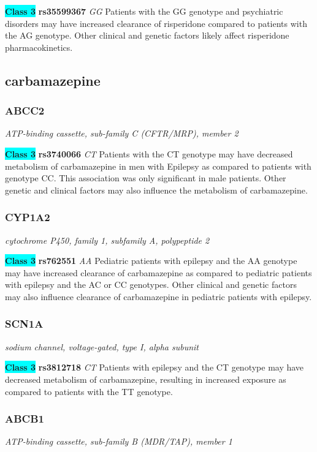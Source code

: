\documentclass{report}
\begin{document}
\textbf{\colorbox{cyan} {Class 3}} \textbf{ rs35599367 } \textit{ GG }
Patients with the GG genotype and psychiatric disorders may have increased clearance of risperidone compared to patients with the AG genotype. Other clinical and genetic factors likely affect risperidone pharmacokinetics.\newline\subsection{ carbamazepine }\subsubsection{ ABCC2 }
\textit{ ATP-binding cassette, sub-family C (CFTR/MRP), member 2 }

\textbf{\colorbox{cyan} {Class 3}} \textbf{ rs3740066 } \textit{ CT }
Patients with the CT genotype may have decreased metabolism of carbamazepine in men with Epilepsy as compared to patients with genotype CC. This association was only significant in male patients. Other genetic and clinical factors may also influence the metabolism of carbamazepine.\newline\subsubsection{ CYP1A2 }
\textit{ cytochrome P450, family 1, subfamily A, polypeptide 2 }

\textbf{\colorbox{cyan} {Class 3}} \textbf{ rs762551 } \textit{ AA }
Pediatric patients with epilepsy and the AA genotype may have increased clearance of carbamazepine as compared to pediatric patients with epilepsy and the AC or CC genotypes. Other clinical and genetic factors may also influence clearance of carbamazepine in pediatric patients with epilepsy.\newline\subsubsection{ SCN1A }
\textit{ sodium channel, voltage-gated, type I, alpha subunit }

\textbf{\colorbox{cyan} {Class 3}} \textbf{ rs3812718 } \textit{ CT }
Patients with epilepsy and the CT genotype may have decreased metabolism of carbamazepine, resulting in increased exposure as compared to patients with the TT genotype. \newline\subsubsection{ ABCB1 }
\textit{ ATP-binding cassette, sub-family B (MDR/TAP), member 1 }
\end{document}
